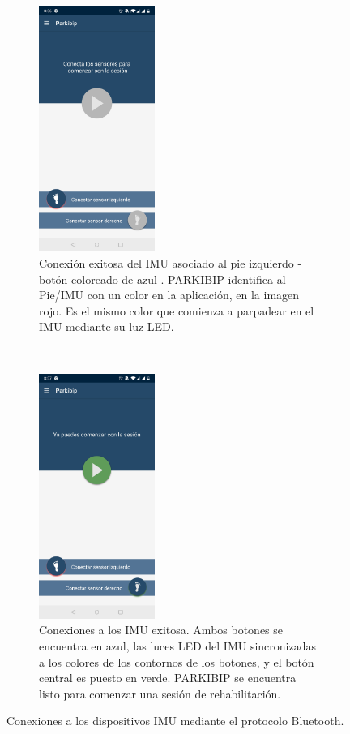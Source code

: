 \begin{figure}[!h]
     \centering
     \begin{subfigure}[t]{0.4\textwidth}
         \centering
         \includegraphics[height=8cm]{TESIS/imagenes/chap05/activity-selected-imu.JPG}
         \caption{Conexión exitosa del IMU asociado al pie izquierdo -botón coloreado de azul-. PARKIBIP identifica al Pie/IMU con un color en la aplicación, en la imagen rojo. Es el mismo color que comienza a parpadear en el IMU mediante su luz LED.}
     \end{subfigure}
     ~
     \begin{subfigure}[t]{0.4\textwidth}
         \centering
         \includegraphics[height=8cm]{TESIS/imagenes/chap05/activity-ready-for-use.JPG}
         \caption{Conexiones a los IMU exitosa. Ambos botones se encuentra en azul, las luces LED del IMU sincronizadas a los colores de los contornos de los botones, y el botón central es puesto en verde. PARKIBIP se encuentra listo para comenzar una sesión de rehabilitación.}
     \end{subfigure}
     \caption{Conexiones a los dispositivos IMU mediante el protocolo Bluetooth.}
     \label{fig:activity-conection-imu}
 \end{figure}

